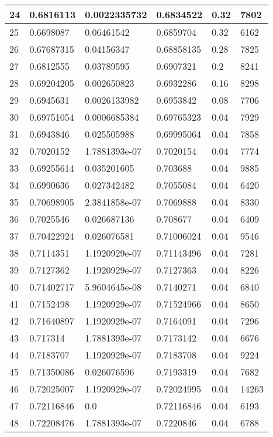 \begin{longtable}{|l|l|l|l|l|l|}
24 & 0.6816113 & 0.0022335732 & 0.6834522 & 0.32 & 7802 \\ \hline 
25 & 0.6698087 & 0.06461542 & 0.6859704 & 0.32 & 6162 \\ \hline 
26 & 0.67687315 & 0.04156347 & 0.68858135 & 0.28 & 7825 \\ \hline 
27 & 0.6812555 & 0.03789595 & 0.6907321 & 0.2 & 8241 \\ \hline 
28 & 0.69204205 & 0.002650823 & 0.6932286 & 0.16 & 8298 \\ \hline 
29 & 0.6945631 & 0.0026133982 & 0.6953842 & 0.08 & 7706 \\ \hline 
30 & 0.69751054 & 0.0006685384 & 0.69765323 & 0.04 & 7929 \\ \hline 
31 & 0.6943846 & 0.025505988 & 0.69995064 & 0.04 & 7858 \\ \hline 
32 & 0.7020152 & 1.7881393e-07 & 0.7020154 & 0.04 & 7774 \\ \hline 
33 & 0.69255614 & 0.035201605 & 0.703688 & 0.04 & 9885 \\ \hline 
34 & 0.6990636 & 0.027342482 & 0.7055084 & 0.04 & 6420 \\ \hline 
35 & 0.70698905 & 2.3841858e-07 & 0.7069888 & 0.04 & 8330 \\ \hline 
36 & 0.7025546 & 0.026687136 & 0.708677 & 0.04 & 6409 \\ \hline 
37 & 0.70422924 & 0.026076581 & 0.71006024 & 0.04 & 9546 \\ \hline 
38 & 0.7114351 & 1.1920929e-07 & 0.71143496 & 0.04 & 7281 \\ \hline 
39 & 0.7127362 & 1.1920929e-07 & 0.7127363 & 0.04 & 8226 \\ \hline 
40 & 0.71402717 & 5.9604645e-08 & 0.7140271 & 0.04 & 6840 \\ \hline 
41 & 0.7152498 & 1.1920929e-07 & 0.71524966 & 0.04 & 8650 \\ \hline 
42 & 0.71640897 & 1.1920929e-07 & 0.7164091 & 0.04 & 7296 \\ \hline 
43 & 0.717314 & 1.7881393e-07 & 0.7173142 & 0.04 & 6676 \\ \hline 
44 & 0.7183707 & 1.1920929e-07 & 0.7183708 & 0.04 & 9224 \\ \hline 
45 & 0.71350086 & 0.026076596 & 0.7193319 & 0.04 & 7682 \\ \hline 
46 & 0.72025007 & 1.1920929e-07 & 0.72024995 & 0.04 & 14263 \\ \hline 
47 & 0.72116846 & 0.0 & 0.72116846 & 0.04 & 6193 \\ \hline 
48 & 0.72208476 & 1.7881393e-07 & 0.7220846 & 0.04 & 6788 \\ \hline 

\end{longtable}
